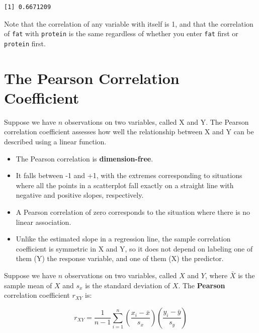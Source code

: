 \documentclass[
]{book}
\newenvironment{Shaded}{\begin{snugshade}}{\end{snugshade}}
\newcommand{\KeywordTok}[1]{\textcolor[rgb]{0.13,0.29,0.53}{\textbf{#1}}}
\newcommand{\NormalTok}[1]{#1}
\newcommand{\OperatorTok}[1]{\textcolor[rgb]{0.81,0.36,0.00}{\textbf{#1}}}
\newcommand{\StringTok}[1]{\textcolor[rgb]{0.31,0.60,0.02}{#1}}
\providecommand{\tightlist}{%
  \setlength{\itemsep}{0pt}\setlength{\parskip}{0pt}}
\begin{document}
\begin{Shaded}
\end{Shaded}

\begin{verbatim}
[1] 0.6671209
\end{verbatim}

Note that the correlation of any variable with itself is 1, and that the correlation of \texttt{fat} with \texttt{protein} is the same regardless of whether you enter \texttt{fat} first or \texttt{protein} first.

\hypertarget{the-pearson-correlation-coefficient}{%
\section{The Pearson Correlation Coefficient}\label{the-pearson-correlation-coefficient}}

Suppose we have \(n\) observations on two variables, called X and Y. The Pearson correlation coefficient assesses how well the relationship between X and Y can be described using a linear function.

\begin{itemize}
\tightlist
\item
  The Pearson correlation is \textbf{dimension-free}.
\item
  It falls between -1 and +1, with the extremes corresponding to situations where all the points in a scatterplot fall exactly on a straight line with negative and positive slopes, respectively.
\item
  A Pearson correlation of zero corresponds to the situation where there is no linear association.
\item
  Unlike the estimated slope in a regression line, the sample correlation coefficient is symmetric in X and Y, so it does not depend on labeling one of them (Y) the response variable, and one of them (X) the predictor.
\end{itemize}

Suppose we have \(n\) observations on two variables, called \(X\) and \(Y\), where \(\bar{X}\) is the sample mean of \(X\) and \(s_x\) is the standard deviation of \(X\). The \textbf{Pearson} correlation coefficient \(r_{XY}\) is:

\[
r_{XY} = \frac{1}{n-1} \sum\limits_{i=1}^n (\frac{x_i - \bar{x}}{s_x}) (\frac{y_i - \bar{y}}{s_y}) 
\]
\end{document}
